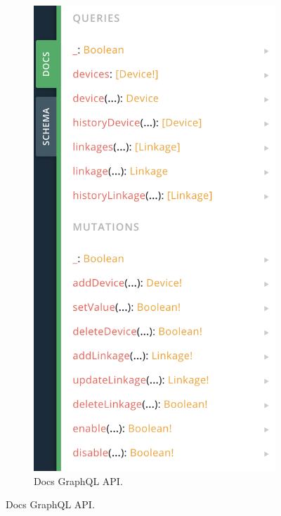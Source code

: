 \begin{figure}[hbtp!]
  \begin{subfigure}{0.5\textwidth}
    \includegraphics[width=\linewidth]{imagenes/desarrollo/web/api/graphql_docs}
    \caption{Docs GraphQL API.}
    \label{fig:graphql-docs}
  \end{subfigure}

\end{figure}
